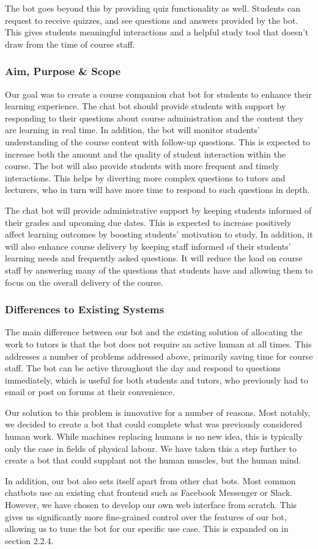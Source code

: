 The bot goes beyond this by providing quiz functionality as well. Students can request to receive quizzes, and see questions and answers provided by the bot. This gives students meaningful interactions and a helpful study tool that doesn't draw from the time of course staff.

\subsubsection{Aim, Purpose \& Scope}
Our goal was to create a course companion chat bot for students to enhance their learning experience. The chat bot should provide students with support by responding to their questions about course administration and the content they are learning in real time. In addition, the bot will monitor students' understanding of the course content with follow-up questions. This is expected to increase both the amount and the quality of student interaction within the course. The bot will also provide students with more frequent and timely interactions. This helps by diverting more complex questions to tutors and lecturers, who in turn will have more time to respond to such questions in depth. 

The chat bot will provide administrative support by keeping students informed of their grades and upcoming due dates. This is expected to increase positively affect learning outcomes by boosting students' motivation to study. In addition, it will also enhance course delivery by keeping staff informed of their students' learning needs and frequently asked questions. It will reduce the load on course staff by answering many of the questions that students have and allowing them to focus on the overall delivery of the course. 

\subsubsection{Differences to Existing Systems}
The main difference between our bot and the existing solution of allocating the work to tutors is that the bot does not require an active human at all times. This addresses a number of problems addressed above, primarily saving time for course staff. The bot can be active throughout the day and respond to questions immediately, which is useful for both students and tutors, who previously had to email or post on forums at their convenience.

Our solution to this problem is innovative for a number of reasons. Most notably, we decided to create a bot that could complete what was previously considered human work. While machines replacing humans is no new idea, this is typically only the case in fields of physical labour. We have taken this a step further to create a bot that could supplant not the human muscles, but the human mind.

In addition, our bot also sets itself apart from other chat bots. Most common chatbots use an existing chat frontend such as Facebook Messenger or Slack. However, we have chosen to develop our own web interface from scratch. This gives us significantly more fine-grained control over the features of our bot, allowing us to tune the bot for our specific use case. This is expanded on in section 2.2.4.

\newpage

